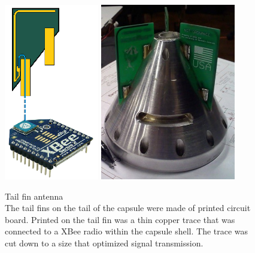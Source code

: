 \documentclass{article}
\begin{document}
	\begin{figure}[H]
	\begin{center}
		\includegraphics[height=7.7cm]{Antenna1}\hspace{1cm}
		\includegraphics[height=7.7cm]{Antenna2}\\
	\end{center}
		\caption{}
		\label{antenna}
Tail fin antenna\\ The tail fins on the tail of the capsule were made of printed circuit board. Printed on the tail fin was a thin copper trace that was connected to a XBee radio within the capsule shell. The trace was cut down to a size that optimized signal transmission.
	\end{figure}
\end{document}
